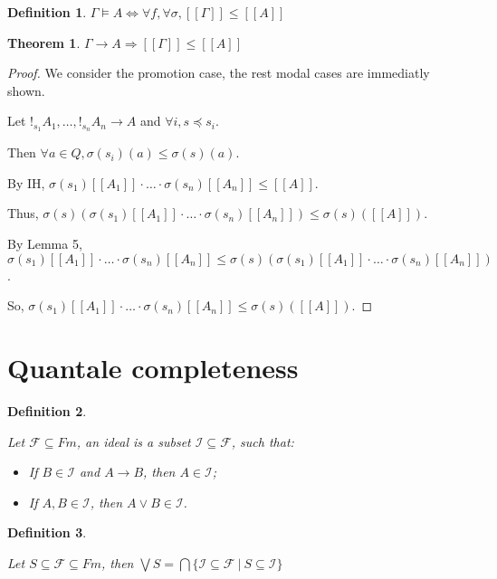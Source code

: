 \documentclass[a4paper]{article}
\theoremstyle{defin}
\newtheorem{defin}{Definition}
\theoremstyle{theorem}
\newtheorem{theorem}{Theorem}
\theoremstyle{prop}
\theoremstyle{lemma}
\theoremstyle{ex}
\theoremstyle{col}
\begin{document}
\begin{defin}
  $\Gamma \models A \Leftrightarrow \forall f, \forall \sigma, [\![\Gamma]\!] \leq [\![A]\!]$
\end{defin}

\begin{theorem}
  $\Gamma \rightarrow A \Rightarrow [\![\Gamma]\!] \leq [\![A]\!]$
\end{theorem}

\begin{proof}
We consider the promotion case, the rest modal cases are immediatly shown.

Let $!_{s_1} A_1, \dots, !_{s_n} A_n \rightarrow A$ and $\forall i, s \preceq s_i$.

Then $\forall a \in Q, \sigma(s_i)(a) \leq \sigma(s)(a)$.

By IH, $\sigma(s_1)[\![A_1]\!] \cdot \dots \cdot \sigma(s_n) [\![A_n]\!] \leq [\![A]\!]$.

Thus, $\sigma(s)(\sigma(s_1)[\![A_1]\!] \cdot \dots \cdot \sigma(s_n) [\![A_n]\!]) \leq \sigma(s)([\![A]\!])$.

By Lemma 5, $\sigma(s_1)[\![A_1]\!] \cdot \dots \cdot \sigma(s_n) [\![A_n]\!] \leq \sigma(s)(\sigma(s_1)[\![A_1]\!] \cdot \dots \cdot \sigma(s_n) [\![A_n]\!])$.

So, $\sigma(s_1)[\![A_1]\!] \cdot \dots \cdot \sigma(s_n) [\![A_n]\!] \leq \sigma(s)([\![A]\!])$.
\end{proof}

\section{Quantale completeness}

\begin{defin}
$ $

  Let $\mathcal{F} \subseteq Fm$, an ideal is a subset $\mathcal{I} \subseteq \mathcal{F}$, such that:

\begin{itemize}
  \item If $B \in \mathcal{I}$ and $A \rightarrow B$, then $A \in \mathcal{I}$;
  \item If $A, B \in \mathcal{I}$, then $A \lor B \in \mathcal{I}$.
\end{itemize}
\end{defin}

\begin{defin}
$ $

  Let $S \subseteq \mathcal{F} \subseteq Fm$,
  then $\bigvee S = \bigcap \{ \mathcal{I} \subseteq \mathcal{F} \: | \: S \subseteq \mathcal{I} \}$
\end{defin}
\end{document}
